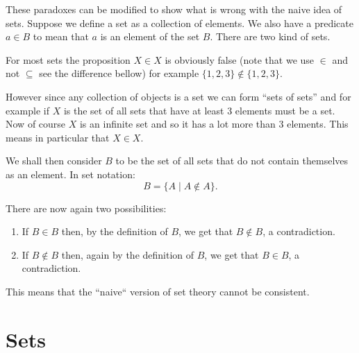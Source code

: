  
These paradoxes can be modified to show   what is wrong with the naive idea of sets. Suppose we define a set as a collection of elements. We also have a predicate $a\in B$ to mean that $a$ is an element of the set $B$. There are two kind of sets.

 For most sets the proposition $X \in X$ is obviously false (note that we use $\in$ and not $\subseteq$ see the difference bellow) for example $\{1,2,3\}\not \in \{1,2,3\}$. 

However since any collection of objects is a set we can form ``sets of sets'' and for example if $X$ is the set of all sets that have at least 3 elements must be a set. Now of course $X$ is an infinite set and so it has a lot more than 3 elements. This means in particular that $X\in X$.

 We shall then consider $B$ to be the set of all sets that do not contain themselves as an element. In set notation:
$$B= \{A \mid A\not\in A\}.$$

There are now again two possibilities:

\begin{enumerate}
\item If $B\in B$ then, by the definition of $B$, we get that $B\not\in B$, a contradiction.
\item If $B\not\in B$ then, again by the definition of $B$, we get that $B \in B$, a contradiction.

\end{enumerate}

This means that the ``naive`` version of set theory cannot be consistent.
 
\section{Sets}\label{sec:sets}
